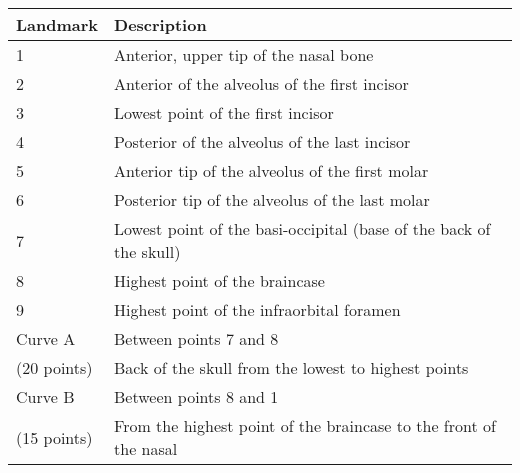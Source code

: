 
\begin{tabular}[t]{p{} p{}}		
\hline
\textbf{Landmark} & \textbf{Description} \\
\hline
1 & Anterior, upper tip of the nasal bone\\
2 & Anterior of the alveolus of the first incisor\\
3 & Lowest point of the first incisor\\
4& Posterior of the alveolus of the last incisor \\
5 & Anterior tip of the alveolus of the first molar\\
6 & Posterior tip of the alveolus of the last molar\\
7 & Lowest point of the basi-occipital (base of the back of the skull)\\
8 & Highest point of the braincase\\
9 & Highest point of the infraorbital foramen\\
\hline
Curve A & Between points 7 and 8  \\
(20 points)& Back of the skull from the lowest to highest points\\
Curve B & Between points 8 and 1  \\
(15 points)&From the highest point of the braincase to the front of the nasal \\
\hline
\end{tabular}
